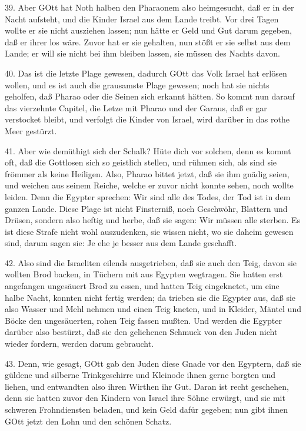 39. Aber GOtt hat Noth halben den Pharaonem also heimgesucht, daß er in der Nacht aufsteht, und die Kinder Israel aus dem Lande treibt. Vor drei Tagen wollte er sie nicht ausziehen lassen; nun hätte er Geld und Gut darum gegeben, daß er ihrer los wäre. Zuvor hat er sie gehalten, nun stößt er sie selbst aus dem Lande; er will sie nicht bei ihm bleiben lassen, sie müssen des Nachts davon.

40. Das ist die letzte Plage gewesen, dadurch GOtt das Volk Israel hat erlösen wollen, und es ist auch die grausamste Plage gewesen; noch hat sie nichts geholfen, daß Pharao oder die Seinen sich erkannt hätten. So kommt nun darauf das vierzehnte Capitel, die Letze mit Pharao und der Garaus, daß er gar verstocket bleibt, und verfolgt die Kinder von Israel, wird darüber in das rothe Meer gestürzt.

41. Aber wie demüthigt sich der Schalk? Hüte dich vor solchen, denn es kommt oft, daß die Gottlosen sich so geistlich stellen, und rühmen sich, als sind sie frömmer als keine Heiligen. Also, Pharao bittet jetzt, daß sie ihm gnädig seien, und weichen aus seinem Reiche, welche er zuvor nicht konnte sehen, noch wollte leiden. Denn die Egypter sprechen: Wir sind alle des Todes, der Tod ist in dem ganzen Lande. Diese Plage ist nicht Finsterniß, noch Geschwöhr, Blattern und Drüsen, sondern also heftig und herbe, daß sie sagen: Wir müssen alle sterben. Es ist diese Strafe nicht wohl auszudenken, sie wissen nicht, wo sie daheim gewesen sind, darum sagen sie: Je ehe je besser aus dem Lande geschafft.

42. Also sind die Israeliten eilends ausgetrieben, daß sie auch den Teig, davon sie wollten Brod backen, in Tüchern mit aus Egypten wegtragen. Sie hatten erst angefangen ungesäuert Brod zu essen, und hatten Teig eingeknetet, um eine halbe Nacht, konnten nicht fertig werden; da trieben sie die Egypter aus, daß sie also Wasser und Mehl nehmen und einen Teig kneten, und in Kleider, Mäntel und Böcke den ungesäuerten, rohen Teig fassen mußten. Und werden die Egypter darüber also bestürzt, daß sie den geliehenen Schmuck von den Juden nicht wieder fordern, werden darum gebraucht.

43. Denn, wie gesagt, GOtt gab den Juden diese Gnade vor den Egyptern, daß sie güldene und silberne Trinkgeschirre und Kleinode ihnen gerne borgten und liehen, und entwandten also ihren Wirthen ihr Gut. Daran ist recht geschehen, denn sie hatten zuvor den Kindern von Israel ihre Söhne erwürgt, und sie mit schweren Frohndiensten beladen, und kein Geld dafür gegeben; nun gibt ihnen GOtt jetzt den Lohn und den schönen Schatz.

